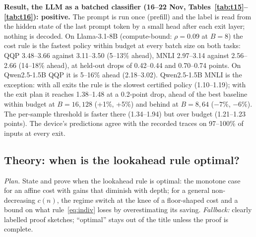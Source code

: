 \textbf{Result, the LLM as a batched classifier (16--22 Nov, Tables~\ref{tab:t15}--\ref{tab:t16}): positive.} The
prompt is run once (prefill) and the label is read from the hidden state of the last prompt token by a small head
after each exit layer; nothing is decoded. On Llama-3.1-8B (compute-bound: $\rho=0.09$ at $B=8$) the cost rule is the
fastest policy within budget at every batch size on both tasks: QQP 3.48--3.66\x{} against 3.11--3.50\x{} (5--13\%
ahead), MNLI 2.97--3.14\x{} against 2.56--2.66\x{} (14--18\% ahead), at held-out drops of 0.42--0.44 and 0.70--0.74
points. On Qwen2.5-1.5B QQP it is 5--16\% ahead (2.18--3.02\x). Qwen2.5-1.5B MNLI is the exception: with all exits
the rule is the slowest certified policy (1.10--1.19\x); with the exit plan it reaches 1.38--1.48\x{} at a 0.2-point
drop, ahead of the best baseline within budget at $B=16,128$ (+1\%, +5\%) and behind at $B=8,64$ ($-7\%$, $-6\%$).
The per-sample threshold is faster there (1.34--1.94\x) but over budget (1.21--1.23 points). The device's predictions
agree with the recorded traces on 97--100\% of inputs at every exit.

\begin{table}[ht]
  \centering\footnotesize\setlength{\tabcolsep}{4pt}
  
  \caption{LLMs as batched classifiers, QQP: LoRA + one exit head per exit on the last prompt token (prefill only,
  prompts padded to 128 tokens, bf16, eager), RTX A6000, trained weights and real prompts, held-out, 2{,}048 inputs
  per pass, 5 rounds. Layout as Table~\ref{tab:t11}. File: .}
  \label{tab:t15}
\end{table}

\begin{table}[ht]
  \centering\footnotesize\setlength{\tabcolsep}{4pt}
  
  \caption{MNLI, same layout. File: .}
  \label{tab:t16}
\end{table}

\subsection{Theory: when is the lookahead rule optimal?}\label{sec:theory}
\textit{Plan.} State and prove when the lookahead rule is optimal: the monotone case~\cite{chow} for an affine cost
with gains that diminish with depth; for a general non-decreasing $c(n)$, the regime switch at the knee of a
floor-shaped cost and a bound on what rule~\eqref{eq:indiv} loses by overestimating its saving.
\textit{Fallback:} clearly labelled proof sketches; ``optimal'' stays out of the title unless the proof is complete.

